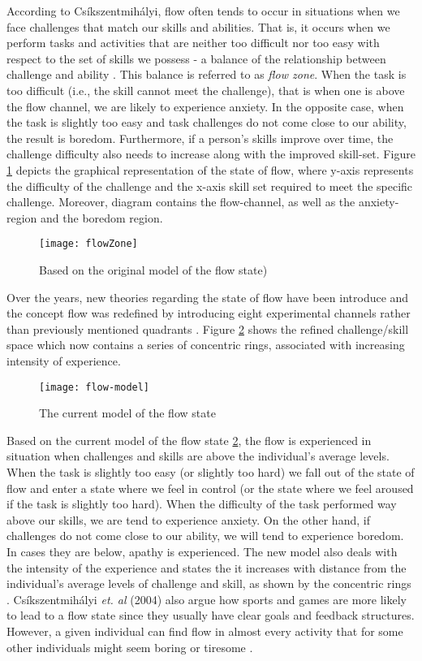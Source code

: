 According to Cs\'{i}kszentmih\'{a}lyi, flow often tends to occur in situations when we face challenges that match our skills and abilities. That is, it occurs when we perform tasks and activities that are neither too difficult nor too easy with respect to the set of skills we possess - a balance of the relationship between challenge and ability \cite{csikszentmihalyi1997finding, flow1990psychology, csikszentmihalyi1996flow}. This balance is referred to as \textit{flow zone}. When the task is too difficult (i.e., the skill cannot meet the challenge), that is when one is above the flow channel, we are likely to experience anxiety. In the opposite case, when the task is slightly too easy and task challenges do not come close to our ability, the result is boredom. Furthermore, if a person's skills improve over time, the challenge difficulty also needs to increase along with the improved skill-set. Figure \ref{fig:flowZone} depicts the graphical representation of the state of flow, where y-axis represents the difficulty of the challenge and the x-axis skill set required to meet the specific challenge. Moreover, diagram contains the flow-channel, as well as the anxiety-region and the boredom region. 
\begin{figure}[h]
    \centering
    \texttt{[image: flowZone]}
    \caption{Based on the original model of the flow state)}
    \label{fig:flowZone}
\end{figure}
Over the years, new theories regarding the state of flow have been introduce and the concept flow was redefined by introducing eight experimental channels rather than previously mentioned quadrants \cite{nakamura2014concept}. Figure \ref{fig:flowModel} shows the refined challenge/skill space which now contains a series of concentric rings, associated with increasing intensity of experience.
\begin{figure}[h]
    \centering
    \texttt{[image: flow-model]}
    \caption{The current model of the flow state \cite{nakamura2014concept}}
    \label{fig:flowModel}
\end{figure}
Based on the current model of the flow state \ref{fig:flowModel}, the flow is experienced in situation when challenges and
skills are above the individual's average levels. When the task is slightly too easy (or slightly too hard) we fall out of the state of flow and enter a state where we feel in control (or the state where we feel aroused if the task is slightly too hard). When the difficulty of the task performed way above our skills, we are tend to experience anxiety. On the other hand, if challenges do not come close to our ability, we will tend to experience boredom. In cases they are below, apathy is experienced. The new model also deals with the intensity of the experience and states the it increases with distance from the individual's average levels of challenge and skill, as shown by the concentric rings \cite{nakamura2014concept}.
Cs\'{i}kszentmih\'{a}lyi \textit{et. al} (2004) also argue how sports and games are more likely to lead to a flow state since they usually have clear goals and feedback structures. However, a given individual can find flow in almost every activity that for some other individuals might seem boring or tiresome \cite{csikszentmihalyi2014flow}.
